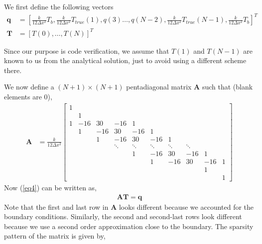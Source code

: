\documentclass[12 pt, final]{article}
\begin{document}
\begin{itemize}
\begin{itemize}
\begin{enumerate}
                We first define the following vectors
                \begin{align*}
                    \mathbf{q} &= \left[\frac{k}{12\Delta x^2} T_b ,\frac{k}{12\Delta x^2} T_{true}(1),q(3) \hdots,q(N-2), \frac{k}{12\Delta x^2} T_{true}(N-1),\frac{k}{12\Delta x^2} T_b\right]^T\\
                    \mathbf{T} &= [T(0) ,\hdots, T(N)]^T
                \end{align*}
                
                Since our purpose is code verification, we assume that $T(1)$ and $T(N-1)$ are known to us from the analytical solution, just to avoid using a different scheme there.
                
                We now define a $(N+1)\times(N+1)$ pentadiagonal matrix $\mathbf{A}$ such that (blank elements are 0),
                \begin{align*}
                    \mathbf{A} &= \frac{k}{12\Delta x^2}\begin{bmatrix} 
                    1\\
                    & 1 &   \\
                    1 & -16 & 30 & -16 & 1  \\
                    &1 & -16 & 30 & -16 & 1  \\
                    &&1 & -16 & 30 & -16 & 1  \\
                    &&& \ddots&\ddots&\ddots&\ddots&\ddots\\
                    &&&& 1 & -16 & 30 & -16 & 1 \\
                    &&&&& 1 & -16 & 30 & -16 & 1\\
                    &&&&&&& & 1 &\\
                    &&&&&&&&& 1
                    \end{bmatrix}
                \end{align*}
                Now (\ref{eq4}) can be written as,
                \begin{align*}
                    \mathbf{AT} = \mathbf{q}
                \end{align*}
                Note that the first and last row in $\mathbf{A}$ looks different because we accounted for the boundary conditions. Similarly, the second and second-last rows look different because we use a second order approximation close to the boundary. The sparsity pattern of the matrix is given by, 
                \begin{align*}

\end{align*}
\end{enumerate}
\end{itemize}
\end{itemize}
\end{document}
